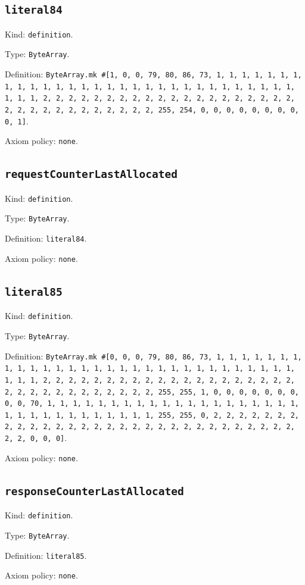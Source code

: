 \documentclass[11pt]{article}
\begin{document}
\subsection*{\texttt{literal84}}
\noindent Kind: \texttt{definition}.\par
\noindent Type: \texttt{ByteArray}.\par
\noindent Definition: \texttt{ByteArray.mk \#[1, 0, 0, 79, 80, 86, 73, 1, 1, 1, 1, 1, 1, 1, 1, 1, 1, 1, 1, 1, 1, 1, 1, 1, 1, 1, 1, 1, 1, 1, 1, 1, 1, 1, 1, 1, 1, 1, 1, 1, 2, 2, 2, 2, 2, 2, 2, 2, 2, 2, 2, 2, 2, 2, 2, 2, 2, 2, 2, 2, 2, 2, 2, 2, 2, 2, 2, 2, 2, 2, 2, 2, 255, 254, 0, 0, 0, 0, 0, 0, 0, 0, 0, 1]}.\par
\noindent Axiom policy: \texttt{none}.\par
\subsection*{\texttt{requestCounterLastAllocated}}
\noindent Kind: \texttt{definition}.\par
\noindent Type: \texttt{ByteArray}.\par
\noindent Definition: \texttt{literal84}.\par
\noindent Axiom policy: \texttt{none}.\par
\subsection*{\texttt{literal85}}
\noindent Kind: \texttt{definition}.\par
\noindent Type: \texttt{ByteArray}.\par
\noindent Definition: \texttt{ByteArray.mk \#[0, 0, 0, 79, 80, 86, 73, 1, 1, 1, 1, 1, 1, 1, 1, 1, 1, 1, 1, 1, 1, 1, 1, 1, 1, 1, 1, 1, 1, 1, 1, 1, 1, 1, 1, 1, 1, 1, 1, 1, 2, 2, 2, 2, 2, 2, 2, 2, 2, 2, 2, 2, 2, 2, 2, 2, 2, 2, 2, 2, 2, 2, 2, 2, 2, 2, 2, 2, 2, 2, 2, 2, 255, 255, 1, 0, 0, 0, 0, 0, 0, 0, 0, 0, 70, 1, 1, 1, 1, 1, 1, 1, 1, 1, 1, 1, 1, 1, 1, 1, 1, 1, 1, 1, 1, 1, 1, 1, 1, 1, 1, 1, 1, 1, 1, 1, 1, 255, 255, 0, 2, 2, 2, 2, 2, 2, 2, 2, 2, 2, 2, 2, 2, 2, 2, 2, 2, 2, 2, 2, 2, 2, 2, 2, 2, 2, 2, 2, 2, 2, 2, 2, 0, 0, 0]}.\par
\noindent Axiom policy: \texttt{none}.\par
\subsection*{\texttt{responseCounterLastAllocated}}
\noindent Kind: \texttt{definition}.\par
\noindent Type: \texttt{ByteArray}.\par
\noindent Definition: \texttt{literal85}.\par
\noindent Axiom policy: \texttt{none}.\par
\end{document}
